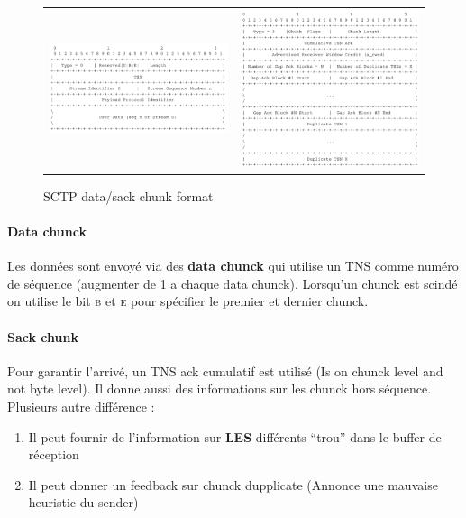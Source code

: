 \begin{figure}[h]
    \centering
    \begin{tabular}{m{8cm}m{8cm}}
    \includegraphics[width=8cm]{datachunk.png} &
    \includegraphics[width=8cm]{sackchunk.png} 
\end{tabular}
    \caption{SCTP data/sack chunk format}
\end{figure}

\paragraph{Data chunck}
Les données sont envoyé via des \textbf{data chunck} qui utilise un TNS comme
numéro de séquence (augmenter de 1 a chaque data chunck). Lorsqu'un chunck est
scindé on utilise le bit \textsc{b} et \textsc{e} pour spécifier le premier et dernier
chunck.

\paragraph{Sack chunk}
Pour garantir l'arrivé, un TNS ack cumulatif est utilisé (Is on chunck level and not
byte level). Il donne aussi des informations sur les chunck hors séquence.
Plusieurs autre différence :
\begin{enumerate}
    \item Il peut fournir de l'information sur \textbf{LES} différents ``trou'' dans le buffer de réception
    \item Il peut donner un feedback sur chunck dupplicate (Annonce une mauvaise heuristic du sender)
\end{enumerate}

